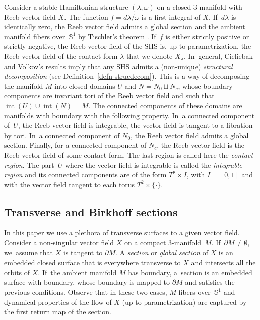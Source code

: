 \documentclass[10pt]{amsart}
\newcommand{\threemanifold}{$3$\nobreakdash-mani\-fold\xspace}
\theoremstyle{definition}
\begin{document}
Consider a stable Hamiltonian structure $(\lambda,\omega)$ on a closed \threemanifold with Reeb vector field $X$. The function $f=d\lambda/\omega$ is a first integral of $X$. If~$d\lambda$ is identically zero, the Reeb vector field admits a global section and the ambient manifold fibers over~$\mathbb{S}^1$ by Tischler's theorem \cite{Tis}. If~$f$ is either strictly positive or strictly negative, the Reeb vector field of the SHS is, up to parametrization, the Reeb vector field of the contact form $\lambda$ that we denote $X_\lambda$. In~general, Cieliebak and Volkov's results \cite{CV1} imply that any SHS admits a (non-unique) \emph{structural decomposition} (see Definition~\ref{defn-strucdecom}). This is a way of decomposing the manifold $M$ into closed domains $U$ and $N=N_0\sqcup N_c$, whose boundary components are invariant tori of the Reeb vector field and such that $\operatorname{int}(U)\cup \operatorname{int}(N)=M$. The connected components of these domains are manifolds with boundary with the following property. In~a connected component of~$U$, the Reeb vector field is integrable, \ie the vector field is tangent to a fibration by tori. In~a connected component of $N_0$, the Reeb vector field admits a global section. Finally, for a connected component of $N_c$, the Reeb vector field is the Reeb vector field of some contact form. The last region is called here the \textit{contact region}. The part~$U$ where the vector field is integrable is called the \textit{integrable region} and its connected components are of the form $T^2\times I$, with $I=[0,1]$ and with the vector field tangent to each torus $T^2\times \{\cdot \}$.

\subsection{Transverse and Birkhoff sections} In this paper we use a plethora of transverse surfaces to a given vector field. Consider a non-singular vector field $X$ on a compact \threemanifold~$M$. If~$\partial M\neq \emptyset$, we~assume that $X$ is tangent to $\partial M$. A \emph{section} or \emph{global section} of $X$ is an embedded closed surface that is everywhere transverse to $X$ and intersects all the orbits of $X$. If~the ambient manifold $M$ has boundary, a~section is an embedded surface with boundary, whose boundary is mapped to $\partial M$ and satisfies the previous conditions. Observe that in these two cases, $M$ fibers over~$\mathbb{S}^1$ and dynamical properties of the flow of $X$ (up to parametrization) are captured by the first return map of the section.
\end{document}
